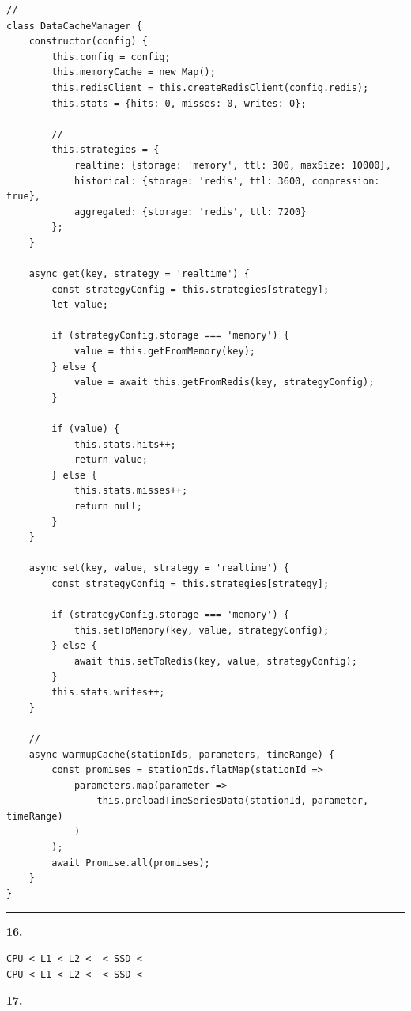 \begin{verbatim}
// 
class DataCacheManager {
    constructor(config) {
        this.config = config;
        this.memoryCache = new Map();
        this.redisClient = this.createRedisClient(config.redis);
        this.stats = {hits: 0, misses: 0, writes: 0};
        
        // 
        this.strategies = {
            realtime: {storage: 'memory', ttl: 300, maxSize: 10000},
            historical: {storage: 'redis', ttl: 3600, compression: true},
            aggregated: {storage: 'redis', ttl: 7200}
        };
    }
    
    async get(key, strategy = 'realtime') {
        const strategyConfig = this.strategies[strategy];
        let value;
        
        if (strategyConfig.storage === 'memory') {
            value = this.getFromMemory(key);
        } else {
            value = await this.getFromRedis(key, strategyConfig);
        }
        
        if (value) {
            this.stats.hits++;
            return value;
        } else {
            this.stats.misses++;
            return null;
        }
    }
    
    async set(key, value, strategy = 'realtime') {
        const strategyConfig = this.strategies[strategy];
        
        if (strategyConfig.storage === 'memory') {
            this.setToMemory(key, value, strategyConfig);
        } else {
            await this.setToRedis(key, value, strategyConfig);
        }
        this.stats.writes++;
    }
    
    // 
    async warmupCache(stationIds, parameters, timeRange) {
        const promises = stationIds.flatMap(stationId => 
            parameters.map(parameter => 
                this.preloadTimeSeriesData(stationId, parameter, timeRange)
            )
        );
        await Promise.all(promises);
    }
}
\end{verbatim}

\begin{center}\rule{0.5\linewidth}{0.5pt}\end{center}

\textbf{16. }

\begin{verbatim}
CPU < L1 < L2 <  < SSD < 
CPU < L1 < L2 <  < SSD < 
\end{verbatim}

\textbf{17. }

